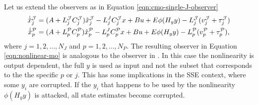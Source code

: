 Let us extend the observers as in Equation \eqref{eqn:cmo-single-J-observer}
\begin{equation}\label{eqn:nonlinear-mo}
    \begin{split}
        \dot{\hat{x}}_{j}^{\mathcal{J}} &= (A + L_{j}^{\mathcal{J}}C_{j}^{\mathcal{J}})\hat{x}^{\mathcal{J}}_{j} - L_{j}^JC_{j}^{\mathcal{J}}x + Bu + E\phi(H_{y}y) - L_{j}^{\mathcal{J}}(v_{j}^{\mathcal{J}} + \tau_{j}^{\mathcal{J}}) \\
        \dot{\hat{x}}_{p}^{\mathcal{P}} &= (A + L_{p}^{\mathcal{P}}C_{p}^{\mathcal{P}})\hat{x}^{\mathcal{P}}_{p} - L_{p}^JC_{p}^{\mathcal{P}}x + Bu + E\phi(H_{y}y) - L_{p}^{\mathcal{P}}(v_{p}^{\mathcal{P}} + \tau_{p}^{\mathcal{P}}),
    \end{split}
\end{equation}
where $j=1,2,\dots,N_J$ and $p=1,2,\dots,N_P$. The resulting observer in Equation \eqref{eqn:nonlinear-mo} is analogous to the observer in \cite[Equation 5]{Chong2023MemoryAlgorithms}. In this case the nonlinearity is output dependent, the full $y$ is used as input and not the subset that corresponds to the the specific $p$ or $j$. This has some implications in the SSE context, where some $y_i$ are corrupted. If the $y_i$ that happens to be used by the nonlinearity $\phi(H_yy)$ is attacked, all state estimates become corrupted.

